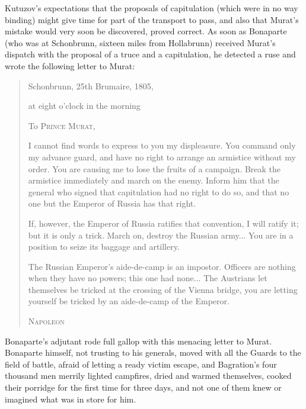 Kutuzov's expectations that the proposals of capitulation (which
were in no way binding) might give time for part of the transport
to pass, and also that Murat's mistake would very soon be
discovered, proved correct.  As soon as Bonaparte (who was at
Schonbrunn, sixteen miles from Hollabrunn) received Murat's
dispatch with the proposal of a truce and a capitulation, he
detected a ruse and wrote the following letter to Murat:

\begin{quote} \calli

Schonbrunn, 25th Brumaire, 1805,

at eight o'clock in the morning

To \textsc{Prince Murat},

I cannot find words to express to you my displeasure. You command
only my advance guard, and have no right to arrange an armistice
without my order. You are causing me to lose the fruits of a
campaign. Break the armistice immediately and march on the
enemy. Inform him that the general who signed that capitulation
had no right to do so, and that no one but the Emperor of Russia
has that right.

If, however, the Emperor of Russia ratifies that convention, I
will ratify it; but it is only a trick. March on, destroy the
Russian army... You are in a position to seize its baggage and
artillery.

The Russian Emperor's aide-de-camp is an impostor. Officers are
nothing when they have no powers; this one had none... The
Austrians let themselves be tricked at the crossing of the Vienna
bridge, you are letting yourself be tricked by an aide-de-camp of
the Emperor.

\textsc{Napoleon}
\end{quote}

Bonaparte's adjutant rode full gallop with this menacing letter
to Murat. Bonaparte himself, not trusting to his generals, moved
with all the Guards to the field of battle, afraid of letting a
ready victim escape, and Bagration's four thousand men merrily
lighted campfires, dried and warmed themselves, cooked their
porridge for the first time for three days, and not one of them
knew or imagined what was in store for him.


